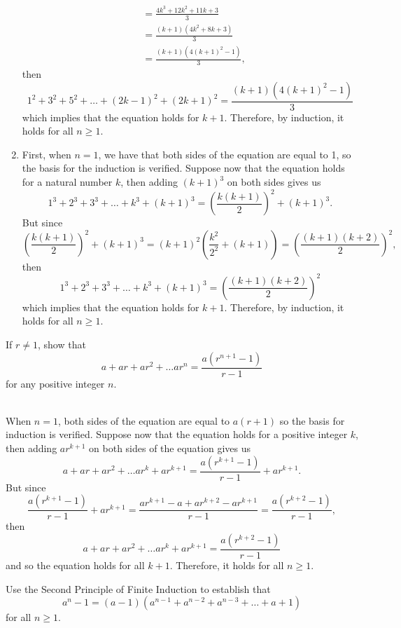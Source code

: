 \begin{solution}
\begin{enumerate}
\begin{align*}
        &= \frac{4k^3 + 12k^2 + 11k + 3}{3} \\
        &= \frac{(k+1)(4k^2 + 8k + 3)}{3} \\
        &= \frac{(k+1)(4(k+1)^2 - 1)}{3},
        \end{align*}
        then
        $$1^2 + 3^2 + 5^2 + \dots + (2k-1)^2 + (2k+1)^2 = \frac{(k+1)(4(k+1)^2 - 1)}{3}$$
        which implies that the equation holds for $k+1$. Therefore, by induction, it holds for all $n \geq 1$. 
        \item First, when $n=1$, we have that both sides of the equation are equal to 1, so the basis for the induction is verified. Suppose now that the equation holds for a natural number $k$, then adding $(k+1)^3$ on both sides gives us
        $$1^3 + 2^3 + 3^3 + \dots + k^3 + (k+1)^3 = \left(\frac{k(k+1)}{2}\right)^2 + (k+1)^3.$$
        But since
        $$\left(\frac{k(k+1)}{2}\right)^2 + (k+1)^3 = (k+1)^2\left(\frac{k^2}{2^2} + (k+1)\right) = \left(\frac{(k+1)(k+2)}{2}\right)^2,$$
        then 
        $$1^3 + 2^3 + 3^3 + \dots + k^3 + (k+1)^3 = \left(\frac{(k+1)(k+2)}{2}\right)^2$$
        which implies that the equation holds for $k+1$. Therefore, by induction, it holds for all $n \geq 1$. 
    \end{enumerate}
\end{solution}

\begin{exercise}
    If $r \neq 1$, show that
    $$a + ar + ar^2 + \dots ar^n = \frac{a(r^{n+1} - 1)}{r-1}$$
    for any positive integer $n$. \\
\end{exercise}

\begin{solution}
    \\ When $n = 1$, both sides of the equation are equal to $a(r+1)$ so the basis for induction is verified. Suppose now that the equation holds for a positive integer $k$, then adding $ar^{k+1}$ on both sides of the equation gives us
    $$a + ar + ar^2 + \dots ar^k + ar^{k+1} = \frac{a(r^{k+1} - 1)}{r-1} + ar^{k+1}.$$
    But since
    $$\frac{a(r^{k+1} - 1)}{r-1} + ar^{k+1} = \frac{ar^{k+1} - a + ar^{k+2} - ar^{k+1}}{r-1} = \frac{a(r^{k+2} - 1)}{r-1},$$
    then 
    $$a + ar + ar^2 + \dots ar^k + ar^{k+1} = \frac{a(r^{k+2} - 1)}{r-1}$$
    and so the equation holds for all $k+1$. Therefore, it holds for all $n \geq 1$. \\ 
\end{solution}

\begin{exercise}
    Use the Second Principle of Finite Induction to establish that
    $$a^n - 1 = (a-1)(a^{n-1} + a^{n-2} + a^{n-3} + \dots + a + 1)$$
    for all $n \geq 1$. \\
\end{exercise}

